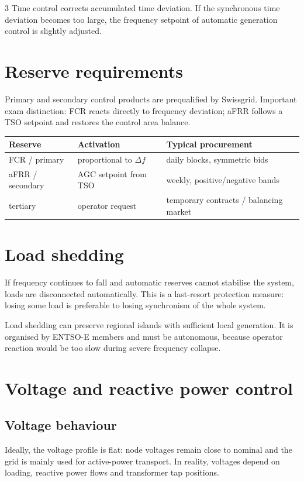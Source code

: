 \documentclass[9pt, landscape, a4paper]{article}
\begin{document}
\begin{multicols*}{3}
Time control corrects accumulated time deviation. If the synchronous time
deviation becomes too large, the frequency setpoint of automatic generation
control is slightly adjusted.

\section{Reserve requirements}
Primary and secondary control products are prequalified by Swissgrid. Important
exam distinction: FCR reacts directly to frequency deviation; aFRR follows a
TSO setpoint and restores the control area balance.

\begin{tabularx}{\columnwidth}{@{}lXX@{}}
  \toprule
  \textbf{Reserve} & \textbf{Activation} & \textbf{Typical procurement}\\
  \midrule
  FCR / primary & proportional to $\Delta f$ & daily blocks, symmetric bids\\
  aFRR / secondary & AGC setpoint from TSO & weekly, positive/negative bands\\
  tertiary & operator request & temporary contracts / balancing market\\
  \bottomrule
\end{tabularx}

\section{Load shedding}
If frequency continues to fall and automatic reserves cannot stabilise the
system, loads are disconnected automatically. This is a last-resort protection
measure: losing some load is preferable to losing synchronism of the whole
system.

Load shedding can preserve regional islands with sufficient local generation.
It is organised by ENTSO-E members and must be autonomous, because operator
reaction would be too slow during severe frequency collapse.

\section{Voltage and reactive power control}
\subsection{Voltage behaviour}
Ideally, the voltage profile is flat: node voltages remain close to nominal and
the grid is mainly used for active-power transport. In reality, voltages depend
on loading, reactive power flows and transformer tap positions.


\end{multicols*}
\end{document}
